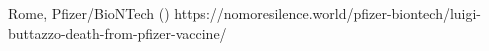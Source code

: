           {Rome, }
          {}
          {Pfizer/BioNTech}
          {}
          {
             ()
          }
          {https://nomoresilence.world/pfizer-biontech/luigi-buttazzo-death-from-pfizer-vaccine/}


